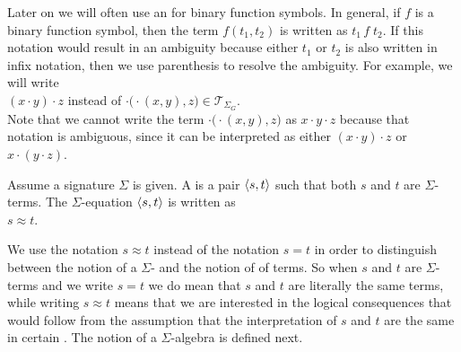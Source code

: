 \remark
Later on we will often use an  for binary function symbols.  In general, if $f$ is a
binary function symbol, then the term $f(t_1,t_2)$ is written as $t_1 \,f\; t_2$.  If this notation would
result in an ambiguity because either $t_1$ or $t_2$ is also written in infix notation, then we use parenthesis
to resolve the ambiguity.  For example, we will write
\\[0.2cm]
\hspace*{1.3cm}
$(x \cdot y) \cdot z$ \quad instead of \quad $\cdot\bigl(\cdot(x,y),z\bigr) \in \mathcal{T}_{\Sigma_G}$.  
\\[0.2cm]
Note that we cannot write the term $\cdot\bigl(\cdot(x,y),z\bigr)$ as $x \cdot y \cdot z$ because that notation
is ambiguous, since it can be interpreted as either $(x \cdot y) \cdot z$ or $x \cdot (y \cdot z)$.
\eoxs

\begin{Definition}
  Assume a signature $\Sigma$ is given.  A  is a pair $\pair(s,t)$ such
  that both $s$ and $t$ are $\Sigma$-terms.  The $\Sigma$-equation $\pair(s,t)$ is written as
  \\[0.2cm]
  \hspace*{1.3cm}
  $s \approx t$.  \eoxs
\end{Definition}

\remark
We use the notation $s \approx t$ instead of the notation $s=t$ in order to distinguish between the notion of a
$\Sigma$- and the notion of  of terms.  So when $s$ and $t$ are $\Sigma$-terms and we
write $s = t$ we do mean that $s$ and $t$ are literally the same terms, while writing $s \approx t$
means that we are interested in the logical consequences that would follow from the assumption that the
interpretation of $s$ and $t$ are the same in certain .  The notion of a $\Sigma$-algebra
is defined next.  \eoxs

